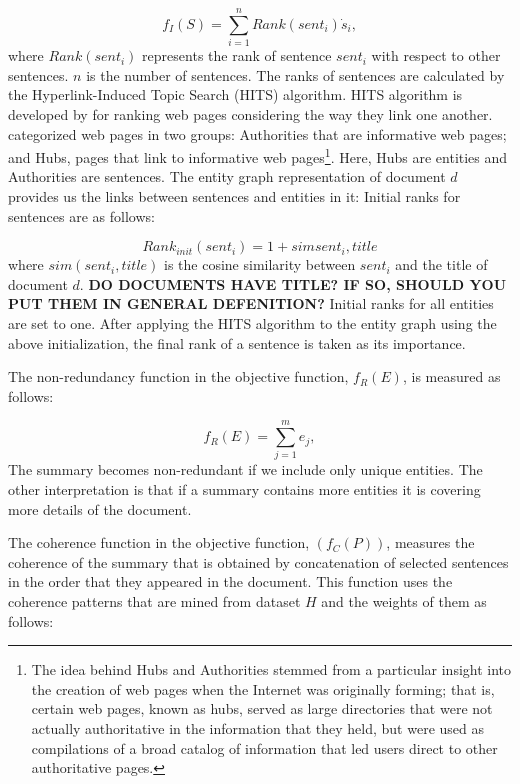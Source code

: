 \begin{equation}
f_I(S) = \sum_{i=1}^{n}{Rank(sent_i) \dot s_i},
\end{equation}
%
where $Rank(sent_i)$ represents the rank of sentence $sent_i$ with respect to other sentences. $n$ is the number of sentences. 
The ranks of sentences are calculated  by the \mbox{Hyperlink-Induced} Topic Search (HITS) algorithm.
HITS algorithm is developed by  for ranking web pages considering the way they link one another. 
 categorized web pages in two groups:  Authorities that are informative web pages; and Hubs, pages that link to informative web pages\footnote{The idea behind Hubs and Authorities stemmed from a particular insight into the creation of web pages when the Internet was originally forming; that is, certain web pages, known as hubs, served as large directories that were not actually authoritative in the information that they held, but were used as compilations of a broad catalog of information that led users direct to other authoritative pages.}.
Here, Hubs are entities and Authorities are sentences. 
The entity graph representation of document $d$ provides us the links between sentences and entities in it:
Initial ranks for sentences are as follows:

\begin{equation}
Rank_{init}(sent_i)= 1+ sim{sent_i,title}
\end{equation}
where $sim(sent_i, title)$ is the cosine similarity between $sent_i$ and the title of document $d$. 
\textbf{DO DOCUMENTS HAVE TITLE? IF SO, SHOULD YOU PUT THEM IN GENERAL DEFENITION?}
Initial ranks for all entities are set to one. 
After applying the HITS algorithm to the entity graph using the above initialization, the final rank of a sentence is taken as its importance. 

The non-redundancy function in the objective function, $f_R(E)$,    
is measured as follows:

\begin{equation}
f_R(E) = \sum_{j=1}^{m}{e_j},
\end{equation}
The summary becomes non-redundant if we include only unique entities.
The other interpretation is that if a summary contains more entities it is covering more details of the document. 

The coherence function in the objective function, $(f_C(P))$, measures the coherence of the summary that is obtained by concatenation of selected sentences in the order that they appeared in the document. 
This function uses the coherence patterns that are mined from dataset $H$ and the weights of them as follows:

